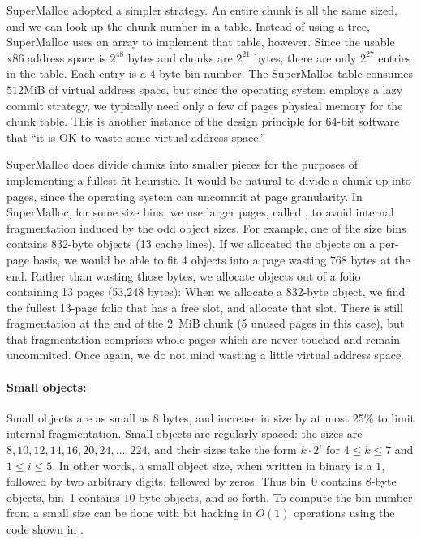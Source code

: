 \documentclass[pldi]{sigplanconf-pldi15}
\begin{document}
SuperMalloc adopted a simpler strategy.  An entire chunk is all the
same sized, and we can look up the chunk number in a table.  Instead
of using a tree, SuperMalloc uses an array to implement that table,
however.  Since the usable x86 address space is $2^{48}$ bytes and
chunks are $2^{21}$ bytes, there are only $2^{27}$ entries in the
table.  Each entry is a 4-byte bin number.  The SuperMalloc table
consumes $512$MiB of virtual address space, but since the operating
system employs a lazy commit strategy, we typically need only a few of
pages physical memory for the chunk table.  This is another instance
of the design principle for 64-bit software that ``it is OK to waste
some virtual address space.''

SuperMalloc does divide chunks into smaller pieces for the purposes of
implementing a fullest-fit heuristic.  It would be natural to divide a
chunk up into pages, since the operating system can uncommit at page
granularity.  In SuperMalloc, for some size bins, we use larger pages,
called , to avoid internal fragmentation induced by the
odd object sizes.  For example, one of the size bins contains 832-byte
objects (13 cache lines).  If we allocated the objects on a per-page
basis, we would be able to fit 4 objects into a page wasting 768 bytes
at the end.  Rather than wasting those bytes, we allocate objects out
of a folio containing 13 pages (53,248 bytes): When we allocate a
832-byte object, we find the fullest 13-page folio that has a free
slot, and allocate that slot.  There is still fragmentation at the end
of the 2~MiB chunk (5 unused pages in this case), but that
fragmentation comprises whole pages which are never touched and remain
uncommited.  Once again, we do not mind wasting a little virtual
address space.

{\paragraph{Small objects:}} Small objects are as small as 8 bytes,
and increase in size by at most 25\% to limit internal fragmentation.
Small objects are regularly spaced: the sizes are $8, 10, 12, 14, 16,
20, 24, \ldots, 224$, and their sizes take the form $k\cdot2^i$ for
$4\leq k \leq 7$ and $1\leq i \leq 5$.  In other words, a small object
size, when written in binary is a $1$, followed by two arbitrary
digits, followed by zeros.  Thus bin~$0$ contains $8$-byte objects,
bin~1 contains $10$-byte objects, and so forth.  To compute the bin
number from a small size can be done with bit hacking in $O(1)$
operations using the code shown in .
\end{document}

